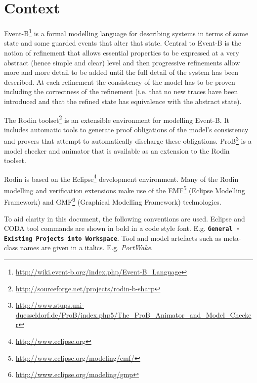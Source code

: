 \section{Context}
\label{sec:component_diagrams-context}

Event-B\footnote{\url{http://wiki.event-b.org/index.php/Event-B_Language}} is a formal modelling language for describing systems in terms of some state and some guarded events that alter that state. 
Central to Event-B is the notion of refinement that allows essential properties to be expressed at a
very abstract (hence simple and clear) level and then progressive refinements allow more 
and more detail to be added until the full detail of the system has been described.
At each refinement the consistency of the model has to be proven including the correctness of the refinement
 (i.e. that no new traces have been introduced and that the refined state has equivalence with the abstract state). 


The Rodin toolset\footnote{\url{http://sourceforge.net/projects/rodin-b-sharp}} is an extensible environment for  modelling Event-B.
It includes automatic tools to generate proof obligations of the model's consistency and provers that attempt to automatically discharge these obligations. 
 ProB\footnote{\url{http://www.stups.uni-duesseldorf.de/ProB/index.php5/The_ProB_Animator_and_Model_Checker}}  is a model checker and animator 
 that is available as an extension to the Rodin toolset.


Rodin is based on the Eclipse\footnote{\url{http://www.eclipse.org}} development environment. Many of the Rodin modelling and verification extensions 
 make use of the EMF\footnote{\url{http://www.eclipse.org/modeling/emf/}} (Eclipse Modelling Framework) and GMF\footnote{\url{http://www.eclipse.org/modeling/gmp}} 
 (Graphical Modelling Framework) technologies.
 
 
To aid clarity in this document, the following conventions are used. Eclipse and CODA tool commands 
 are shown in bold in a code style font. E.g. \textbf{\texttt{General - Existing Projects into Workspace}}.
Tool and model artefacts such as meta-class names are given in a italics. E.g. \emph{PortWake}.


